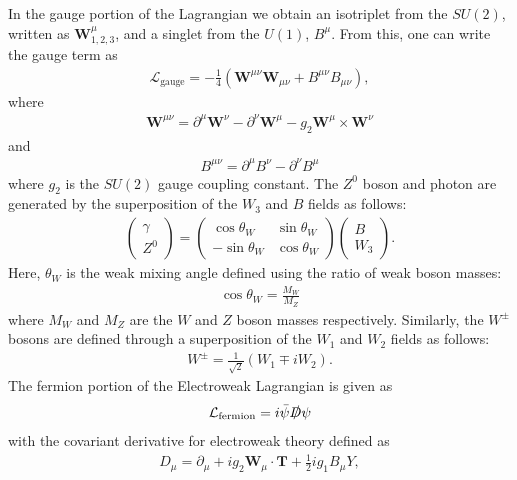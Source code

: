 \noindent In the gauge portion of the Lagrangian we obtain an isotriplet from the $SU(2)$, written as $\textbf{W}^{\mu}_{1,2,3}$, and a singlet from the $U(1)$, $B^{\mu}$.
From this, one can write the gauge term as
\begin{align}
\mathcal{L}_{\textrm{gauge}} = -\frac{1}{4}\left(\textbf{W}^{\mu \nu}\textbf{W}_{\mu \nu} + B^{\mu \nu}B_{\mu \nu} \right),
\end{align}
where
\begin{align}
\textbf{W}^{\mu \nu} = \partial^{\mu} \textbf{W}^{\nu} - \partial^{\nu} \textbf{W}^{\mu} - g_{2} \textbf{W}^{\mu} \times \textbf{W}^{\nu}
\end{align}
and
\begin{align}
B^{\mu \nu} = \partial^{\mu} B^{\nu} - \partial^{\nu} B^{\mu}
\end{align}
where $g_{2}$ is the $SU(2)$ gauge coupling constant.
The $Z^{0}$ boson and photon are generated by the superposition of the $W_{3}$ and $B$ fields as follows:
\begin{align}
\begin{pmatrix}
\gamma \\
Z^{0}
\end{pmatrix} = \begin{pmatrix} 
\cos\theta_{W} & \sin\theta_{W} \\
-\sin\theta_{W}& \cos\theta_{W} 
\end{pmatrix} \begin{pmatrix}
B \\
W_{3}
 \end{pmatrix}.
\end{align}
Here, $\theta_{W}$ is the weak mixing angle defined using the ratio of weak boson masses:
\begin{align} 
\cos\theta_{W} = \frac{M_{W}}{M_{Z}}
\end{align}
where $M_{W}$ and $M_{Z}$ are the $W$ and $Z$ boson masses respectively.
Similarly, the $W^{\pm}$ bosons are defined through a superposition of the $W_{1}$ and $W_{2}$ fields as follows:
\begin{align}
W^{\pm} = \frac{1}{\sqrt{2}} \left(W_{1} \mp iW_{2} \right).
\end{align}
The fermion portion of the Electroweak Lagrangian is given as
\begin{align}
\mathcal{L}_{\textrm{fermion}} = i \bar{\psi}\slashed{D}\psi
\end{align}
with the covariant derivative for electroweak theory defined as 
\begin{align}
D_{\mu} =  \partial_{\mu} + ig_{2}\textbf{W}_{\mu} \cdot \textbf{T} + \frac{1}{2} ig_{1} B_{\mu} Y,
\label{eqn:EWDerivative}
\end{align}
